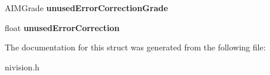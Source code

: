 \begin{DoxyCompactItemize}
\item 
\hypertarget{structAIMGradeReport__struct_a090d2ed2bd6bb767a6e9e1e4a5c83961}{
AIMGrade {\bfseries unusedErrorCorrectionGrade}}
\label{structAIMGradeReport__struct_a090d2ed2bd6bb767a6e9e1e4a5c83961}

\item 
\hypertarget{structAIMGradeReport__struct_a1b9cc87d5be396f730463b063bf37cee}{
float {\bfseries unusedErrorCorrection}}
\label{structAIMGradeReport__struct_a1b9cc87d5be396f730463b063bf37cee}

\end{DoxyCompactItemize}


The documentation for this struct was generated from the following file:\begin{DoxyCompactItemize}
\item 
nivision.h\end{DoxyCompactItemize}
